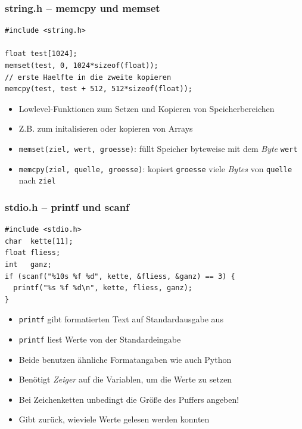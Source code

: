\documentclass{slides}
\begin{document}
\begin{frame}[fragile]
  \frametitle{string.h -- memcpy und memset}
  
\begin{lstlisting}[emph={memset,memcpy}]
#include <string.h>

float test[1024];
memset(test, 0, 1024*sizeof(float));
// erste Haelfte in die zweite kopieren
memcpy(test, test + 512, 512*sizeof(float));
\end{lstlisting}

  \begin{itemize}
  \item Lowlevel-Funktionen zum Setzen und Kopieren von Speicherbereichen
  \item Z.B. zum initalisieren oder kopieren von Arrays
  \item \lstinline!memset(ziel, wert, groesse)!: füllt Speicher
    byteweise mit dem \emph{Byte} \lstinline!wert!
  \item \lstinline!memcpy(ziel, quelle, groesse)!: kopiert \lstinline!groesse! viele \emph{Bytes}
    von \lstinline!quelle! nach \lstinline!ziel!
  \end{itemize}
\end{frame}

\begin{frame}[fragile]
  \frametitle{stdio.h -- printf und scanf}
\begin{lstlisting}[emph={printf,scanf}]
#include <stdio.h>
char  kette[11];
float fliess;
int   ganz;
if (scanf("%10s %f %d", kette, &fliess, &ganz) == 3) {
  printf("%s %f %d\n", kette, fliess, ganz);
}
\end{lstlisting}

  \begin{itemize}
  \item \lstinline!printf! gibt formatierten Text auf Standardausgabe aus
  \item \lstinline!printf! liest Werte von der Standardeingabe
  \item Beide benutzen ähnliche Formatangaben wie auch Python
  \end{itemize}
  \begin{itemize}
  \item Benötigt \emph{Zeiger} auf die Variablen, um die Werte zu setzen
  \item Bei Zeichenketten unbedingt die Größe des Puffers angeben!
  \item Gibt zurück, wieviele Werte gelesen werden konnten
  \end{itemize}
\end{frame}
\end{document}

